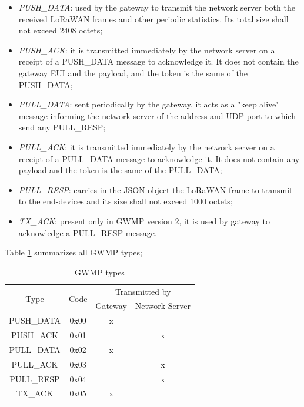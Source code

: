 \begin{itemize}
\item \emph{PUSH\_DATA}: used by the gateway to transmit the network server both the received LoRaWAN frames and other periodic statistics. Its total size shall not exceed 2408 octets;
\item \emph{PUSH\_ACK}: it is transmitted immediately by the network server on a receipt of a PUSH\_DATA message to acknowledge it. It does not contain the gateway EUI and the payload, and the token is the same of the PUSH\_DATA;
\item \emph{PULL\_DATA}: sent periodically by the gateway, it acts as a "keep alive" message informing the network server of the address and UDP port to which send any PULL\_RESP;
\item \emph{PULL\_ACK}: it is transmitted immediately by the network server on a receipt of a PULL\_DATA message to acknowledge it. It does not contain any payload and the token is the same of the PULL\_DATA;
\item \emph{PULL\_RESP}: carries in the JSON object the LoRaWAN frame to transmit to the end-devices and its size shall not exceed 1000 octets;
\item \emph{TX\_ACK}: present only in GWMP version 2, it is used by gateway to acknowledge a PULL\_RESP message.
\end{itemize}
Table \ref{tab:gwmptypes} summarizes all GWMP types;

\begin{table}[]
\centering
\caption{GWMP types}
\label{tab:gwmptypes}
\begin{tabular}{@{}cccc@{}}
\toprule
\multirow{2}{*}{Type} & \multirow{2}{*}{Code} & \multicolumn{2}{c}{Transmitted by} \\
                      &                       & Gateway      & Network Server      \\ \midrule
PUSH\_DATA            & 0x00                  & x            &                     \\
PUSH\_ACK             & 0x01                  &              & x                   \\
PULL\_DATA            & 0x02                  & x            &                     \\
PULL\_ACK             & 0x03                  &              & x                   \\
PULL\_RESP            & 0x04                  &              & x                   \\
TX\_ACK               & 0x05                  & x            &                     \\ \bottomrule
\end{tabular}
\end{table}



